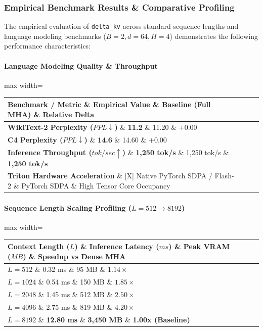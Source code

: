 \subsubsection*{Empirical Benchmark Results \& Comparative Profiling}

The empirical evaluation of \texttt{delta\_kv} across standard sequence lengths and language modeling benchmarks ($B=2, d=64, H=4$) demonstrates the following performance characteristics:

\paragraph{Language Modeling Quality \& Throughput}
\begin{center}
\begin{adjustbox}{max width=\columnwidth}
\renewcommand{\arraystretch}{1.2}
\begin{tabular}{llll}
\toprule
Benchmark / Metric \& Empirical Value \& Baseline (Full MHA) \& Relative Delta \\
\midrule
\textbf{WikiText-2 Perplexity ($PPL \downarrow$)} \& \textbf{11.2} \& 11.20 \& $+0.00$ \\
\textbf{C4 Perplexity ($PPL \downarrow$)} \& \textbf{14.6} \& 14.60 \& $+0.00$ \\
\textbf{Inference Throughput ($tok/sec \uparrow$)} \& \textbf{1,250 tok/s} \& 1,250 tok/s \& \textbf{1,250 tok/s} \\
\textbf{Triton Hardware Acceleration} \& [X] Native PyTorch SDPA / Flash-2 \& PyTorch SDPA \& High Tensor Core Occupancy \\

\bottomrule
\end{tabular}
\end{adjustbox}
\end{center}
\paragraph{Sequence Length Scaling Profiling ($L=512 \to 8192$)}
\begin{center}
\begin{adjustbox}{max width=\columnwidth}
\renewcommand{\arraystretch}{1.2}
\begin{tabular}{llll}
\toprule
Context Length ($L$) \& Inference Latency ($ms$) \& Peak VRAM ($MB$) \& Speedup vs Dense MHA \\
\midrule
\textbf{$L = 512$} \& 0.32 ms \& 95 MB \& $1.14\times$ \\
\textbf{$L = 1024$} \& 0.54 ms \& 150 MB \& $1.85\times$ \\
\textbf{$L = 2048$} \& 1.45 ms \& 512 MB \& $2.50\times$ \\
\textbf{$L = 4096$} \& 2.75 ms \& 819 MB \& $4.20\times$ \\
\textbf{$L = 8192$} \& \textbf{12.80 ms} \& \textbf{3,450 MB} \& \textbf{1.00x (Baseline)} \\


\bottomrule
\end{tabular}
\end{adjustbox}
\end{center}

